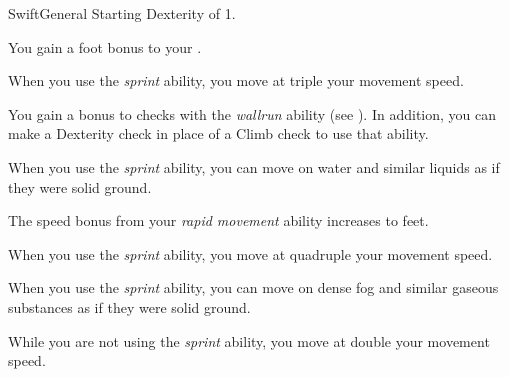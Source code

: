     \begin{feat}{Swift}{General}
        \featpre Starting Dexterity of 1.

         You gain a  foot bonus to your .

         When you use the \textit{sprint} ability, you move at triple your movement speed.

         You gain a  bonus to checks with the \textit{wallrun} ability (see ).
        In addition, you can make a Dexterity check in place of a Climb check to use that ability.

         When you use the \textit{sprint} ability, you can move on water and similar liquids as if they were solid ground.

         The speed bonus from your \textit{rapid movement} ability increases to  feet.

         When you use the \textit{sprint} ability, you move at quadruple your movement speed.

         When you use the \textit{sprint} ability, you can move on dense fog and similar gaseous substances as if they were solid ground.

         While you are not using the \textit{sprint} ability, you move at double your movement speed.
    \end{feat}


